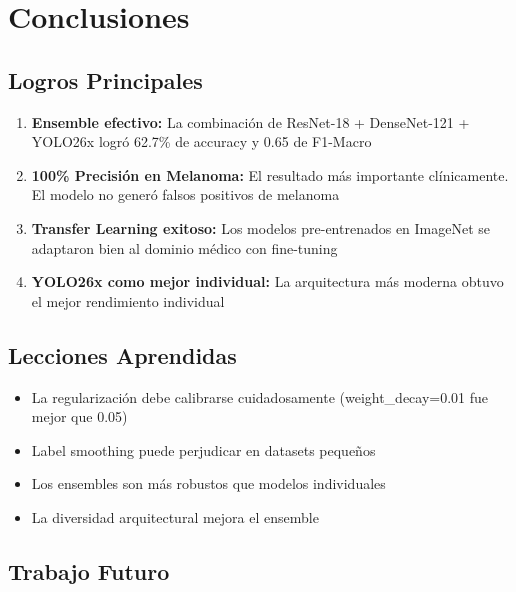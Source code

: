 \documentclass[12pt,a4paper]{article}
\begin{document}
\newpage

\section{Conclusiones}

\subsection{Logros Principales}

\begin{enumerate}
    \item \textbf{Ensemble efectivo:} La combinación de ResNet-18 + DenseNet-121 + YOLO26x logró 62.7\% de accuracy y 0.65 de F1-Macro

    \item \textbf{100\% Precisión en Melanoma:} El resultado más importante clínicamente. El modelo no generó falsos positivos de melanoma

    \item \textbf{Transfer Learning exitoso:} Los modelos pre-entrenados en ImageNet se adaptaron bien al dominio médico con fine-tuning

    \item \textbf{YOLO26x como mejor individual:} La arquitectura más moderna obtuvo el mejor rendimiento individual
\end{enumerate}

\subsection{Lecciones Aprendidas}

\begin{itemize}
    \item La regularización debe calibrarse cuidadosamente (weight\_decay=0.01 fue mejor que 0.05)
    \item Label smoothing puede perjudicar en datasets pequeños
    \item Los ensembles son más robustos que modelos individuales
    \item La diversidad arquitectural mejora el ensemble
\end{itemize}

\subsection{Trabajo Futuro}
\end{document}
